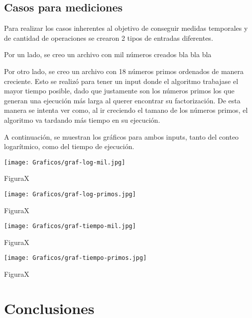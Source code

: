 \documentclass[a4paper, 12pt] {article}
\begin{document}
\subsection*{Casos para mediciones}
Para realizar los casos inherentes al objetivo de conseguir medidas temporales y de cantidad de operaciones se crearon 2 tipos de entradas diferentes.

Por un lado, se creo un archivo con mil n\'umeros creados bla bla bla

Por otro lado, se creo un archivo con 18 n\'umeros primos ordenados de manera creciente. Esto se realiz\'o para tener un input donde el algoritmo trabajase el mayor tiempo posible, dado que justamente son los n\'umeros primos los que generan una ejecuci\'on m\'as larga al querer encontrar su factorizaci\'on. De esta manera se intenta ver como, al ir creciendo el tamano de los n\'umeros primos, el algoritmo va tardando m\'as tiempo en su ejecuci\'on.

A continuaci\'on, se muestran los gr\'aficos para ambos inputs, tanto del conteo logar\'itmico, como del tiempo de ejecuci\'on.
\begin{center}
\texttt{[image: Graficos/graf-log-mil.jpg]}
\begin{center}
FiguraX
\end{center}
\end{center}

\begin{center}
\texttt{[image: Graficos/graf-log-primos.jpg]}
\begin{center}
FiguraX
\end{center}
\end{center}

\begin{center}
\texttt{[image: Graficos/graf-tiempo-mil.jpg]}
\begin{center}
FiguraX
\end{center}
\end{center}

\begin{center}
\texttt{[image: Graficos/graf-tiempo-primos.jpg]}
\begin{center}
FiguraX
\end{center}
\end{center}

\section*{Conclusiones}
\newpage
\end{document}
